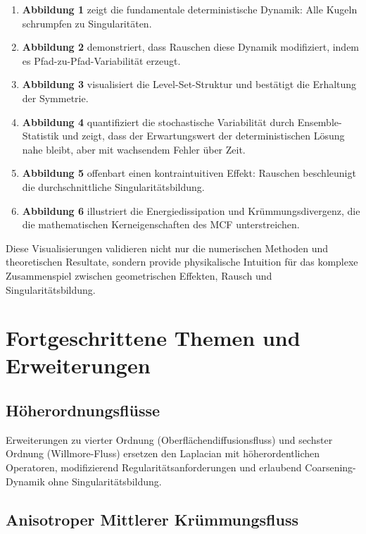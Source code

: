 \documentclass[a4paper,12pt]{article}
\theoremstyle{definition}
\begin{document}
\begin{enumerate}
	\item \textbf{Abbildung 1} zeigt die fundamentale deterministische Dynamik: Alle Kugeln schrumpfen zu Singularitäten.
	
	\item \textbf{Abbildung 2} demonstriert, dass Rauschen diese Dynamik modifiziert, indem es Pfad-zu-Pfad-Variabilität erzeugt.
	
	\item \textbf{Abbildung 3} visualisiert die Level-Set-Struktur und bestätigt die Erhaltung der Symmetrie.
	
	\item \textbf{Abbildung 4} quantifiziert die stochastische Variabilität durch Ensemble-Statistik und zeigt, dass der Erwartungswert der deterministischen Lösung nahe bleibt, aber mit wachsendem Fehler über Zeit.
	
	\item \textbf{Abbildung 5} offenbart einen kontraintuitiven Effekt: Rauschen beschleunigt die durchschnittliche Singularitätsbildung.
	
	\item \textbf{Abbildung 6} illustriert die Energiedissipation und Krümmungsdivergenz, die die mathematischen Kerneigenschaften des MCF unterstreichen.
\end{enumerate}

Diese Visualisierungen validieren nicht nur die numerischen Methoden und theoretischen Resultate, sondern provide physikalische Intuition für das komplexe Zusammenspiel zwischen geometrischen Effekten, Rausch und Singularitätsbildung.

\section{Fortgeschrittene Themen und Erweiterungen}
\label{sec:advanced}

\subsection{Höherordnungsflüsse}

Erweiterungen zu vierter Ordnung (Oberflächendiffusionsfluss) und sechster Ordnung (Willmore-Fluss) ersetzen den Laplacian mit höherordentlichen Operatoren, modifizierend Regularitätsanforderungen und erlaubend Coarsening-Dynamik ohne Singularitätsbildung.

\subsection{Anisotroper Mittlerer Krümmungsfluss}
\end{document}
